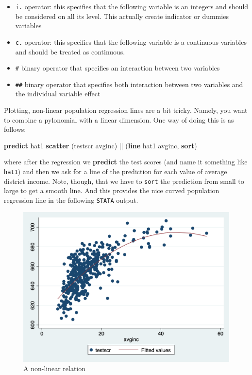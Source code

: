 \documentclass[
]{book}
\newenvironment{Shaded}{\begin{snugshade}}{\end{snugshade}}
\newcommand{\KeywordTok}[1]{\textcolor[rgb]{0.13,0.29,0.53}{\textbf{#1}}}
\newcommand{\NormalTok}[1]{#1}
\providecommand{\tightlist}{%
  \setlength{\itemsep}{0pt}\setlength{\parskip}{0pt}}
\begin{document}
\begin{itemize}
\tightlist
\item
  \texttt{i.} operator: this specifies that the following variable is an integers and should be considered on all its level. This actually create indicator or dummies variables
\item
  \texttt{c.} operator: this specifies that the following variable is a continuous variables and should be treated as continuous.
\item
  \texttt{\#} binary operator that specifies an interaction between two variables
\item
  \texttt{\#\#} binary operator that specifies both interaction between two variables and the individual variable effect
\end{itemize}

Plotting, non-linear population regression lines are a bit tricky. Namely, you want to combine a pylonomial with a linear dimension. One way of doing this is as follows:

\begin{Shaded}
\begin{Highlighting}[]
\KeywordTok{predict}\NormalTok{ hat1 }
\KeywordTok{scatter}\NormalTok{ (testscr avginc) || (}\KeywordTok{line}\NormalTok{ hat1 avginc, }\KeywordTok{sort}\NormalTok{)}
\end{Highlighting}
\end{Shaded}

where after the regression we \textbf{predict} the test scores (and name it something like \texttt{hat1}) and then we ask for a line of the prediction for each value of average district income. Note, though, that we have to \texttt{sort} the prediction from small to large to get a smooth line. And this provides the nice curved population regression line in the following \texttt{STATA} output.

\begin{figure}

{\centering \includegraphics[width=600px]{./figures/scatterqua} 

}

\caption{A non-linear relation}\label{fig:scatterqua}
\end{figure}
\end{document}
